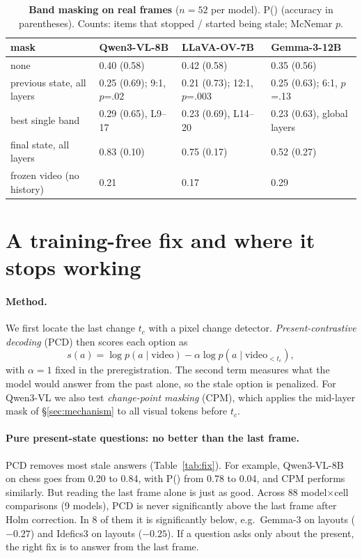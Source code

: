 \documentclass[10pt,twocolumn,letterpaper]{article}
\newcommand{\pstale}{P(\text{stale})}
\begin{document}
\begin{table}[t]
  \centering
  \small
  \caption{\textbf{Band masking on real frames} ($n=52$ per model). \pstale{} (accuracy in parentheses). Counts: items that stopped / started being stale; McNemar $p$.}
  \label{tab:ah}
  \begin{tabular}{llll}
    \toprule
    mask & Qwen3-VL-8B & LLaVA-OV-7B & Gemma-3-12B \\
    \midrule
    none & 0.40 (0.58) & 0.42 (0.58) & 0.35 (0.56) \\
    previous state, all layers & 0.25 (0.69); 9:1, $p$=.02 & 0.21 (0.73); 12:1, $p$=.003 & 0.25 (0.63); 6:1, $p$=.13 \\
    best single band & 0.29 (0.65), L9--17 & 0.23 (0.69), L14--20 & 0.23 (0.63), global layers \\
    final state, all layers & 0.83 (0.10) & 0.75 (0.17) & 0.52 (0.27) \\
    \midrule
    frozen video (no history) & 0.21 & 0.17 & 0.29 \\
    \bottomrule
  \end{tabular}
\end{table}

\section{A training-free fix and where it stops working}
\label{sec:fix}

\paragraph{Method.} We first locate the last change $t_c$ with a pixel change detector. \emph{Present-contrastive decoding} (PCD) then scores each option as
\[
s(a) = \log p(a \mid \text{video}) - \alpha \log p(a \mid \text{video}_{<t_c}),
\]
with $\alpha = 1$ fixed in the preregistration.
The second term measures what the model would answer from the past alone, so the stale option is penalized. For Qwen3-VL we also test \emph{change-point masking} (CPM), which applies the mid-layer mask of \S\ref{sec:mechanism} to all visual tokens before $t_c$.

\paragraph{Pure present-state questions: no better than the last frame.} PCD removes most stale answers (Table~\ref{tab:fix}). For example, Qwen3-VL-8B on chess goes from 0.20 to 0.84, with \pstale{} from 0.78 to 0.04, and CPM performs similarly. But reading the last frame alone is just as good. Across 88 model$\times$cell comparisons (9 models), PCD is never significantly above the last frame after Holm correction. In 8 of them it is significantly below, e.g.\ Gemma-3 on layouts ($-0.27$) and Idefics3 on layouts ($-0.25$). If a question asks only about the present, the right fix is to answer from the last frame.
\end{document}
